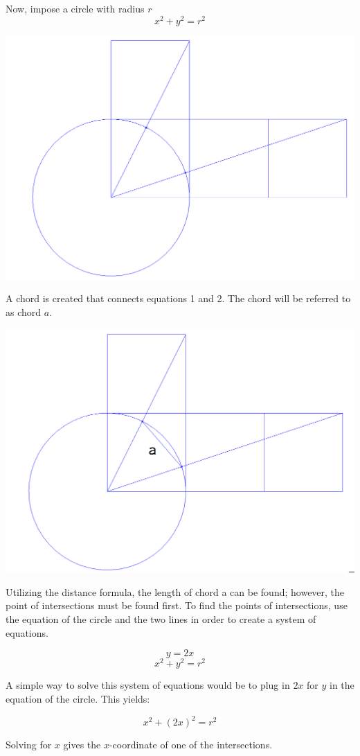 \documentclass{article}
\begin{document}
Now, impose a circle with radius $r$ $$x^2+y^2=r^2$$
\begin{center}
	\includegraphics[width=.8\linewidth]{circle.png}
\end{center}

\pagebreak
A chord is created that connects equations 1 and 2. The chord will be referred to as chord $a$. 
\begin{center}
	\includegraphics[width=.8\linewidth]{chord.png}
\end{center}

 Utilizing the distance formula, the length of chord a can be found; however, the point of intersections must be found first. To find the points of intersections, use the equation of the circle and the two lines in order to create a system of equations. 
 
$$ y=2x $$
$$ x^2+y^2=r^2 $$

A simple way to solve this system of equations would be to plug in $2x$ for $y$ in the equation of the circle. This yields:

$$ x^2+(2x)^2=r^2 $$

Solving for $x$ gives the $x$-coordinate of one of the intersections.
\end{document}
